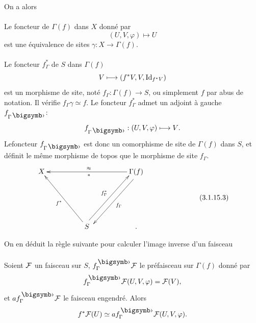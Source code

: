 \documentclass[10pt]{../fichiers-configuration-latex/smfart}
\begin{document}
On a alors

\paragraph{}
Le foncteur de $\Gamma(f)$ dans $X$ donné par
$$
(U,V,\varphi)\longmapsto U
$$
est une équivalence de sites $\gamma:X\rightarrow \Gamma(f)$.

\paragraph{}
Le foncteur $f^{\ast}_{\Gamma}$ de $S$ dans $\Gamma(f)$
$$
V\longmapsto (f^{\ast}V,V,\operatorname{Id}_{f^{\ast}V})
$$
est un morphisme de site, noté $f_{\Gamma}:\Gamma(f)\rightarrow S$, ou
simplement $f$ par abus de notation. Il vérifie
$f_{\Gamma}\gamma\simeq f$. Le foncteur $f^{\ast}_{\Gamma}$ admet un
adjoint à gauche $f_{\Gamma\bigdot}$:
$$
f_{\Gamma\bigdot}:(U,V,\varphi)\longmapsto V{\quoi}.
$$
Le\pageoriginale foncteur $f_{\Gamma\bigdot}$ est donc un comorphisme
de site de $\Gamma(f)$ dans $S$,
et définit le même morphisme de topos
que le morphisme de site $f_{\Gamma}$.
\begin{equation*}
\vcenter{
\xymatrix@R=2.2cm@C=1.75cm{
X &         &\Gamma(f) \ar[ll]^{\ast}_{\approx}
\ar@<4pt>[ld]^{f_{\Gamma}}& \\
  &    S \ar[lu]^{f^{\ast}}  \ar@<4pt>[ru]^{f^{\ast}_{\Gamma}} & .
}}\tag{3.1.15.3}
\end{equation*}

On en déduit la règle suivante pour calculer l'image inverse d'un
faisceau

\setcounter{paragraph}{3}
\paragraph{}
Soient ${\mathcal F}$ un faisceau sur $S$,
$f^{\bigdot}_{\Gamma}\Ff$ le préfaisceau sur $\Gamma(f)$ donné
par
$$
f^{\bigdot}_{\Gamma}\Ff(U,V,\varphi)=\Ff(V){\quoi},
$$
et $af^{\bigdot}_{\Gamma}\Ff$ le faisceau engendré. Alors
$$
f^{\ast}\Ff(U)\simeq
af^{\bigdot}_{\Gamma}\Ff(U,V,\varphi){\quoi}.
$$
\end{document}
